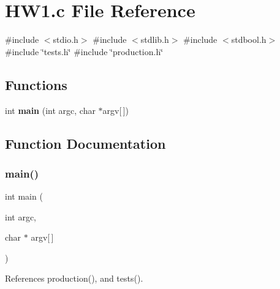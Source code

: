 \section{H\+W1.\+c File Reference}
\label{HW1_8c}
{\ttfamily \#include $<$stdio.\+h$>$}\newline
{\ttfamily \#include $<$stdlib.\+h$>$}\newline
{\ttfamily \#include $<$stdbool.\+h$>$}\newline
{\ttfamily \#include \char`\"{}tests.\+h\char`\"{}}\newline
{\ttfamily \#include \char`\"{}production.\+h\char`\"{}}\newline
\subsection*{Functions}
\begin{DoxyCompactItemize}
\item 
int \textbf{ main} (int argc, char $\ast$argv[$\,$])
\end{DoxyCompactItemize}


\subsection{Function Documentation}
\mbox{\label{HW1_8c_a0ddf1224851353fc92bfbff6f499fa97}} 
\subsubsection{main()}
{\footnotesize\ttfamily int main (\begin{DoxyParamCaption}\item[{int}]{argc,  }\item[{char $\ast$}]{argv[$\,$] }\end{DoxyParamCaption})}



References production(), and tests().

